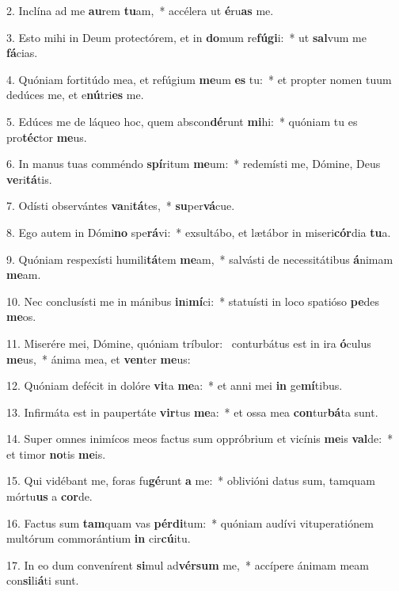 2. Inclína ad me \textbf{au}rem \textbf{tu}am,~*  accélera ut \textbf{é}ru\textbf{as} me.\

3. Esto mihi in Deum protectórem, et in \textbf{do}mum re\textbf{fú}\textbf{gi}i:~*  ut \textbf{sal}vum me \textbf{fá}cias.\

4. Quóniam fortitúdo mea, et refúgium \textbf{me}um \textbf{es} tu:~*  et propter nomen tuum dedúces me, et e\textbf{nú}tri\textbf{es} me.\

5. Edúces me de láqueo hoc, quem abscon\textbf{dé}runt \textbf{mi}hi:~*  quóniam tu es pro\textbf{téc}tor \textbf{me}us.\

6. In manus tuas comméndo \textbf{spí}ritum \textbf{me}um:~*  redemísti me, Dómine, Deus \textbf{ve}ri\textbf{tá}tis.\

7. Odísti observántes \textbf{va}ni\textbf{tá}tes,~*  \textbf{su}per\textbf{vá}cue.\

8. Ego autem in Dómi\textbf{no} spe\textbf{rá}vi:~*  exsultábo, et lætábor in miseri\textbf{cór}dia \textbf{tu}a.\

9. Quóniam respexísti humili\textbf{tá}tem \textbf{me}am,~*  salvásti de necessitátibus \textbf{á}nimam \textbf{me}am.\

10. Nec conclusísti me in mánibus \textbf{in}i\textbf{mí}ci:~*  statuísti in loco spatióso \textbf{pe}des \textbf{me}os.\

11. Miserére mei, Dómine, quóniam tríbulor: \dag\  conturbátus est in ira \textbf{ó}culus \textbf{me}us,~*  ánima mea, et \textbf{ven}ter \textbf{me}us:\

12. Quóniam defécit in dolóre \textbf{vi}ta \textbf{me}a:~*  et anni mei \textbf{in} ge\textbf{mí}tibus.\

13. Infirmáta est in paupertáte \textbf{vir}tus \textbf{me}a:~*  et ossa mea \textbf{con}tur\textbf{bá}ta sunt.\

14. Super omnes inimícos meos factus sum oppróbrium et vicínis \textbf{me}is \textbf{val}de:~*  et timor \textbf{no}tis \textbf{me}is.\

15. Qui vidébant me, foras fu\textbf{gé}runt \textbf{a} me:~*  oblivióni datus sum, tamquam mórtu\textbf{us} a \textbf{cor}de.\

16. Factus sum \textbf{tam}quam vas \textbf{pér}\textbf{di}tum:~*  quóniam audívi vituperatiónem multórum commorántium \textbf{in} cir\textbf{cú}itu.\

17. In eo dum convenírent \textbf{si}mul ad\textbf{vér}\textbf{sum} me,~*  accípere ánimam meam con\textbf{si}li\textbf{á}ti sunt.\

